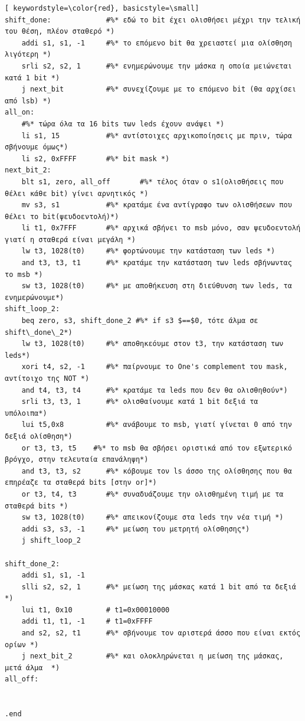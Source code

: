 \documentclass[a4paper]{article}
\begin{document}
\begin{lstlisting}[ keywordstyle=\color{red}, basicstyle=\small]
shift_done:				#%* εδώ το bit έχει ολισθήσει μέχρι την τελική του θέση, πλέον σταθερό *)
    addi s1, s1, -1		#%* το επόμενο bit θα χρειαστεί μια ολίσθηση λιγότερη *)
    srli s2, s2, 1      #%* ενημερώνουμε την μάσκα η οποία μειώνεται κατά 1 bit *)
    j next_bit			#%* συνεχίζουμε με το επόμενο bit (θα αρχίσει από lsb) *)
all_on:
    #%* τώρα όλα τα 16 bits των leds έχουν ανάψει *) 
    li s1, 15       	#%* αντίστοιχες αρχικοποίησεις με πριν, τώρα σβήνουμε όμως*) 
    li s2, 0xFFFF   	#%* bit mask *)
next_bit_2: 
    blt s1, zero, all_off		#%* τέλος όταν ο s1(ολισθήσεις που θέλει κάθε bit) γίνει αρνητικός *)
    mv s3, s1       	#%* κρατάμε ένα αντίγραφο των ολισθήσεων που θέλει το bit(ψευδοεντολή)*)
    li t1, 0x7FFF       #%* αρχικά σβήνει το msb μόνο, σαν ψευδοεντολή γιατί η σταθερά είναι μεγάλη *)
    lw t3, 1028(t0) 	#%* φορτώνουμε την κατάσταση των leds *)
    and t3, t3, t1  	#%* κρατάμε την κατάσταση των leds σβήνωντας το msb *)
    sw t3, 1028(t0) 	#%* με αποθήκευση στη διεύθυνση των leds, τα ενημερώνουμε*)
shift_loop_2:
    beq zero, s3, shift_done_2 #%* if s3 $==$0, τότε άλμα σε shift\_done\_2*)
    lw t3, 1028(t0)     #%* αποθηκεόυμε στον t3, την κατάσταση των leds*)
    xori t4, s2, -1     #%* παίρνουμε το One's complement του mask, αντίτοιχο της NOT *)
    and t4, t3, t4      #%* κρατάμε τα leds που δεν θα ολισθηθούν*)
    srli t3, t3, 1      #%* ολισθαίνουμε κατά 1 bit δεξιά τα υπόλοιπα*)
    lui t5,0x8          #%* ανάβουμε το msb, γιατί γίνεται 0 από την δεξιά ολίσθηση*)
    or t3, t3, t5    #%* το msb θα σβήσει οριστικά από τον εξωτερικό βρόγχο, στην τελευταία επανάληψη*)
    and t3, t3, s2      #%* κόβουμε τον ls άσσο της ολίσθησης που θα επηρέαζε τα σταθερά bits [στην or]*)
    or t3, t4, t3       #%* συναδυάζουμε την ολισθημένη τιμή με τα σταθερά bits *)
    sw t3, 1028(t0)     #%* απεικονίζουμε στα leds την νέα τιμή *)
    addi s3, s3, -1     #%* μείωση του μετρητή ολίσθησης*)
    j shift_loop_2

shift_done_2:
    addi s1, s1, -1
    slli s2, s2, 1  	#%* μείωση της μάσκας κατά 1 bit από τα δεξιά *)
    lui t1, 0x10    	# t1=0x00010000
    addi t1, t1, -1 	# t1=0xFFFF
    and s2, s2, t1  	#%* σβήνουμε τον αριστερά άσσο που είναι εκτός ορίων *)
    j next_bit_2		#%* και ολοκληρώνεται η μείωση της μάσκας, μετά άλμα  *)
all_off:


.end

\end{lstlisting}
\end{document}
